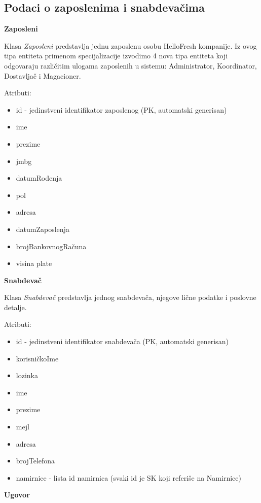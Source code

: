 
\subsection{Podaci o zaposlenima i snabdevačima}

\textbf{\large Zaposleni}
\vspace{0.3cm}

Klasa \textit{Zaposleni} predstavlja jednu zaposlenu osobu HelloFresh kompanije. Iz ovog tipa entiteta primenom specijalizacije izvodimo 4 nova tipa entiteta koji odgovaraju različitim ulogama zaposlenih u sistemu: Administrator, Koordinator, Dostavljač i Magacioner.

Atributi:
\begin{itemize}
    \item id - jedinstveni identifikator zaposlenog (PK, automatski generisan)
    \item ime
    \item prezime
    \item jmbg
    \item datumRođenja
    \item pol
    \item adresa
    \item datumZaposlenja
    \item brojBankovnogRačuna
    \item visina plate
\end{itemize}

\textbf{\large Snabdevač}
\vspace{0.3cm}

Klasa \textit{Snabdevač} predstavlja jednog snabdevača, njegove lične podatke i poslovne detalje.

Atributi:
\begin{itemize}
    \item id - jedinstveni identifikator snabdevača (PK, automatski generisan)
    \item korisničkoIme
    \item lozinka
    \item ime
    \item prezime
    \item mejl
    \item adresa
    \item brojTelefona
    \item namirnice - lista id namirnica (svaki id je SK koji referiše na Namirnice)
\end{itemize}

\textbf{\large Ugovor}
\vspace{0.3cm}

